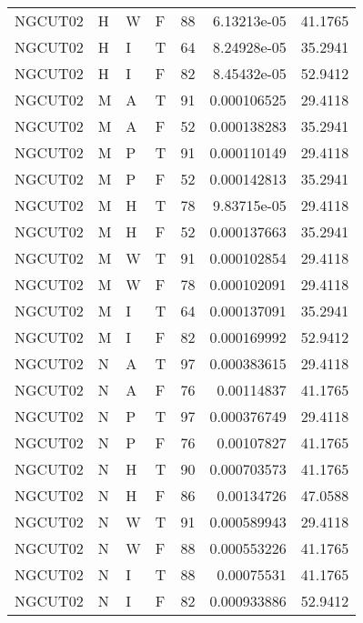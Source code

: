 \begin{table}[!htb]
{\begin{tabular}{llllrrr}
            NGCUT02  & H     & W     & F          & 88         & 6.13213e-05 & 41.1765  \\
            NGCUT02  & H     & I     & T          & 64         & 8.24928e-05 & 35.2941  \\
            NGCUT02  & H     & I     & F          & 82         & 8.45432e-05 & 52.9412  \\
            NGCUT02  & M     & A     & T          & 91         & 0.000106525 & 29.4118  \\
            NGCUT02  & M     & A     & F          & 52         & 0.000138283 & 35.2941  \\
            NGCUT02  & M     & P     & T          & 91         & 0.000110149 & 29.4118  \\
            NGCUT02  & M     & P     & F          & 52         & 0.000142813 & 35.2941  \\
            NGCUT02  & M     & H     & T          & 78         & 9.83715e-05 & 29.4118  \\
            NGCUT02  & M     & H     & F          & 52         & 0.000137663 & 35.2941  \\
            NGCUT02  & M     & W     & T          & 91         & 0.000102854 & 29.4118  \\
            NGCUT02  & M     & W     & F          & 78         & 0.000102091 & 29.4118  \\
            NGCUT02  & M     & I     & T          & 64         & 0.000137091 & 35.2941  \\
            NGCUT02  & M     & I     & F          & 82         & 0.000169992 & 52.9412  \\
            NGCUT02  & N     & A     & T          & 97         & 0.000383615 & 29.4118  \\
            NGCUT02  & N     & A     & F          & 76         & 0.00114837  & 41.1765  \\
            NGCUT02  & N     & P     & T          & 97         & 0.000376749 & 29.4118  \\
            NGCUT02  & N     & P     & F          & 76         & 0.00107827  & 41.1765  \\
            NGCUT02  & N     & H     & T          & 90         & 0.000703573 & 41.1765  \\
            NGCUT02  & N     & H     & F          & 86         & 0.00134726  & 47.0588  \\
            NGCUT02  & N     & W     & T          & 91         & 0.000589943 & 29.4118  \\
            NGCUT02  & N     & W     & F          & 88         & 0.000553226 & 41.1765  \\
            NGCUT02  & N     & I     & T          & 88         & 0.00075531  & 41.1765  \\
            NGCUT02  & N     & I     & F          & 82         & 0.000933886 & 52.9412  \\
            \hline
        \end{tabular}
    }{}
\end{table}